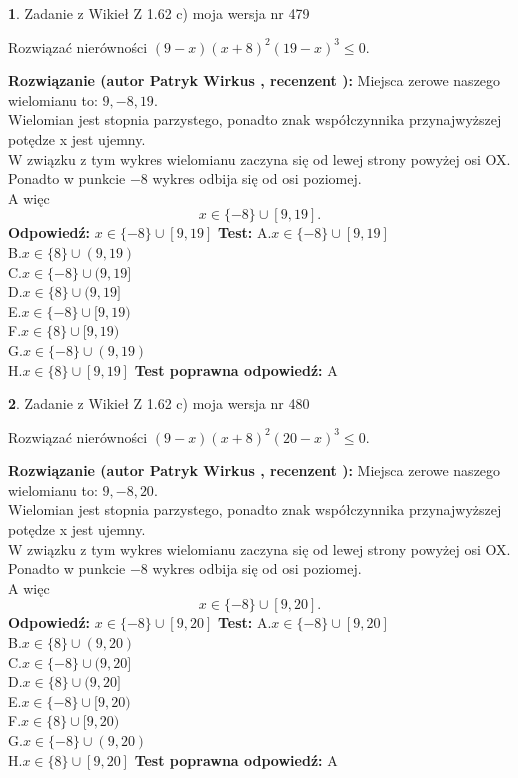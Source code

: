 \documentclass[12pt, a4paper]{article}
\theoremstyle{definition} %
\newtheorem{zad}{}
\newcommand{\zadStart}[1]{\begin{zad}#1\newline}
\newcommand{\zadStop}{\end{zad}}
\newcommand{\rozwStart}[2]{\noindent \textbf{Rozwiązanie (autor #1 , recenzent #2): }\newline}
\newcommand{\rozwStop}{\newline}
\newcommand{\odpStart}{\noindent \textbf{Odpowiedź:}\newline}
\newcommand{\odpStop}{\newline}
\newcommand{\testStart}{\noindent \textbf{Test:}\newline}
\newcommand{\testStop}{\newline}
\newcommand{\kluczStart}{\noindent \textbf{Test poprawna odpowiedź:}\newline}
\newcommand{\kluczStop}{\newline}
\begin{document}
\zadStart{Zadanie z Wikieł Z 1.62 c) moja wersja nr 479}

Rozwiązać nierówności $(9-x)(x+8)^{2}(19-x)^{3}\le0$.
\zadStop
\rozwStart{Patryk Wirkus}{}
Miejsca zerowe naszego wielomianu to: $9, -8, 19$.\\
Wielomian jest stopnia parzystego, ponadto znak współczynnika przy\linebreak najwyższej potędze x jest ujemny.\\ W związku z tym wykres wielomianu zaczyna się od lewej strony powyżej osi OX.\\
Ponadto w punkcie $-8$ wykres odbija się od osi poziomej.\\
A więc $$x \in \{-8\} \cup [9,19].$$
\rozwStop
\odpStart
$x \in \{-8\} \cup [9,19]$
\odpStop
\testStart
A.$x \in \{-8\} \cup [9,19]$\\
B.$x \in \{8\} \cup (9,19)$\\
C.$x \in \{-8\} \cup (9,19]$\\
D.$x \in \{8\} \cup (9,19]$\\
E.$x \in \{-8\} \cup [9,19)$\\
F.$x \in \{8\} \cup [9,19)$\\
G.$x \in \{-8\} \cup (9,19)$\\
H.$x \in \{8\} \cup [9,19]$
\testStop
\kluczStart
A
\kluczStop



\zadStart{Zadanie z Wikieł Z 1.62 c) moja wersja nr 480}

Rozwiązać nierówności $(9-x)(x+8)^{2}(20-x)^{3}\le0$.
\zadStop
\rozwStart{Patryk Wirkus}{}
Miejsca zerowe naszego wielomianu to: $9, -8, 20$.\\
Wielomian jest stopnia parzystego, ponadto znak współczynnika przy\linebreak najwyższej potędze x jest ujemny.\\ W związku z tym wykres wielomianu zaczyna się od lewej strony powyżej osi OX.\\
Ponadto w punkcie $-8$ wykres odbija się od osi poziomej.\\
A więc $$x \in \{-8\} \cup [9,20].$$
\rozwStop
\odpStart
$x \in \{-8\} \cup [9,20]$
\odpStop
\testStart
A.$x \in \{-8\} \cup [9,20]$\\
B.$x \in \{8\} \cup (9,20)$\\
C.$x \in \{-8\} \cup (9,20]$\\
D.$x \in \{8\} \cup (9,20]$\\
E.$x \in \{-8\} \cup [9,20)$\\
F.$x \in \{8\} \cup [9,20)$\\
G.$x \in \{-8\} \cup (9,20)$\\
H.$x \in \{8\} \cup [9,20]$
\testStop
\kluczStart
A
\kluczStop
\end{document}
